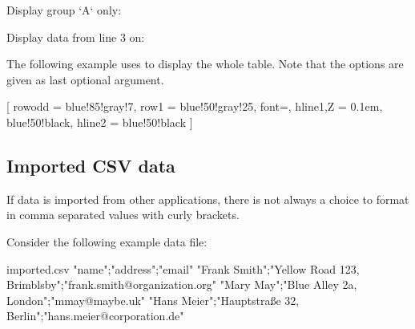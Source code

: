 \documentclass[a4paper,11pt]{ltxdoc}
\begin{document}
\begin{dispExample}
Display group `A` only:\par
{}
\end{dispExample}


\begin{dispExample}
Display data from line 3 on:\par
{}
\end{dispExample}


\clearpage

The following example uses  to display the whole
table. Note that the  options are given as last
optional argument.

\begin{dispExample}
  [
    row{odd}   = {blue!85!gray!7},
    row{1}     = {blue!50!gray!25, font=\bfseries},
    hline{1,Z} = {0.1em, blue!50!black},
    hline{2}   = {blue!50!black}
  ]
\end{dispExample}



\clearpage
\subsection{Imported CSV data}\label{sec:importeddata}%
If data is imported from other applications, there is not always a choice
to format in comma separated values with curly brackets.

Consider the following example data file:

\begin{tcbverbatimwrite}{imported.csv}
"name";"address";"email"
"Frank Smith";"Yellow Road 123, Brimblsby";"frank.smith@organization.org"
"Mary May";"Blue Alley 2a, London";"mmay@maybe.uk"
"Hans Meier";"Hauptstraße 32, Berlin";"hans.meier@corporation.de"
\end{tcbverbatimwrite}
\end{document}
